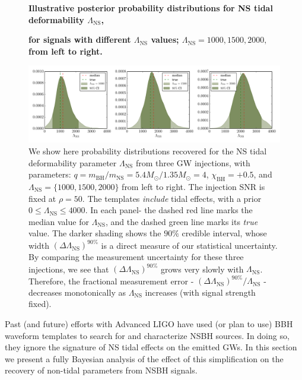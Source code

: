\documentclass[aps,prd,amsmath,floats,floatfix, twocolumn,
superscriptaddress,nofootinbib,showpacs]{revtex4-1}
\newcommand{\lambdans}{\Lambda_\mathrm{NS}}
\newcommand{\chibh}{\chi_\mathrm{BH}}
\newcommand{\mbh}{m_\mathrm{BH}}
\newcommand{\mns}{m_\mathrm{NS}}
\begin{document}
\begin{figure}
\centering 
\textbf{Illustrative posterior probability distributions for NS tidal
deformability $\lambdans$,}\par
\textbf{for signals with different $\lambdans$ values; $\lambdans = 1000,1500,2000,$
from left to right.}\par\medskip
\includegraphics[width=1.9\columnwidth]{plots/SingleSystemLambdaVary_q4_0_mc2_25_chi0_50_snr50}
\caption{We show here probability distributions recovered for the NS tidal
deformability parameter $\lambdans$ from three GW injections, with parameters:
$q = \mbh/\mns = 5.4M_\odot/1.35M_\odot = 4$, $\chibh=+0.5$, and 
$\lambdans=\{1000,1500,2000\}$ from left to right. The injection SNR is fixed at
$\rho=50$. The templates {\it include} tidal effects, with a prior $0\leq\lambdans\leq 4000$.
% 
In each panel- the dashed red line marks the median value for
$\lambdans$, and the dashed green line marks its {\it true} value.
The darker shading shows the $90\%$ credible interval, whose width
$(\Delta\lambdans)^{90\%}$ is a direct measure of our statistical uncertainty.
By comparing the measurement uncertainty for these three injections, we see
that $(\Delta\lambdans)^{90\%}$ grows very slowly with $\lambdans$. Therefore,
the fractional measurement error - $(\Delta\lambdans)^{90\%}/\lambdans$ -
decreases monotonically as $\lambdans$ increases (with signal strength fixed).
% 
}
\label{fig:SingleSystemLambdaPDFvsSNR}
\end{figure}
% 
Past (and future) efforts with Advanced LIGO have used (or plan to use) BBH
waveform templates to search for and characterize NSBH sources. In doing so,
they ignore the signature of NS tidal effects on the emitted GWs. In this
section we present a fully Bayesian analysis of the effect of this
simplification on the recovery of non-tidal parameters from NSBH signals.
\end{document}
